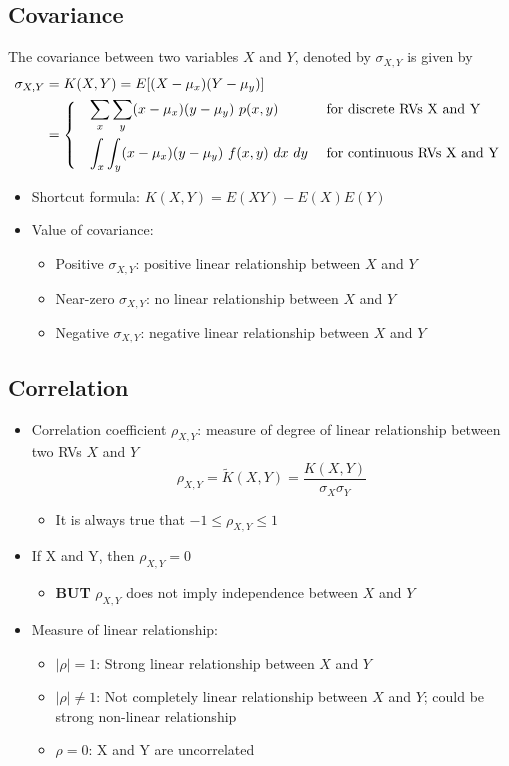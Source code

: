\documentclass[a4paper]{article}
\begin{document}
\subsection{Covariance}
The covariance between two variables $X$ and $Y$, denoted by $\sigma_{X, Y}$ is given  by
\begin{align*}
    \sigma_{X, Y} &= K(X, Y) = E[(X-\mu_{x})(Y-\mu_{y})]\\
    &= \begin{dcases*}
    \quad \sum_{x}\sum_{y}(x-\mu_{x})(y-\mu_{y}) \ p(x, y) &\mbox{} \text{for discrete RVs X and Y}\\
    \quad \int_{x}\int_{y}(x-\mu_{x})(y-\mu_{y}) \ f(x, y) \ dx \ dy &\mbox{} \text{for continuous RVs X and Y}
    \end{dcases*}
\end{align*}
\begin{itemize}
    \item Shortcut formula: $K(X, Y) = E(XY) - E(X)E(Y)$
    \item Value of covariance:
    \begin{itemize}[label=$\circ$]
        \item Positive $\sigma_{X, Y}$: positive linear relationship between $X$ and $Y$
        \item Near-zero $\sigma_{X, Y}$: no linear relationship between $X$ and $Y$
        \item Negative $\sigma_{X, Y}$: negative linear relationship between $X$ and $Y$
    \end{itemize}
\end{itemize}
\newpage
\subsection{Correlation}
\begin{itemize}
    \item Correlation coefficient $\rho_{X, Y}$: measure of degree of linear relationship between two RVs $X$ and $Y$
    $$\rho_{X, Y} = \widetilde{K}(X, Y) = \frac{K(X, Y)}{\sigma_{X}\sigma_{Y}}
    $$
    \begin{itemize}[label=$\circ$]
        \item It is always true that $-1\leq\rho_{X, Y}\leq 1$
    \end{itemize}
    \item If X and Y, then $\rho_{X, Y} = 0$
    \begin{itemize}[label=$\circ$]
        \item \textbf{BUT} $\rho_{X, Y}$ does not imply independence between $X$ and $Y$
    \end{itemize}
    \item Measure of linear relationship:
    \begin{itemize}[label=$\circ$]
        \item $|\rho| = 1$: Strong linear relationship between $X$ and $Y$
        \item $|\rho| \neq 1$: Not completely linear relationship between $X$ and $Y$; could be strong non-linear relationship
        \item $\rho = 0$: X and Y are uncorrelated
    \end{itemize}
\end{itemize}
\newpage
\end{document}
